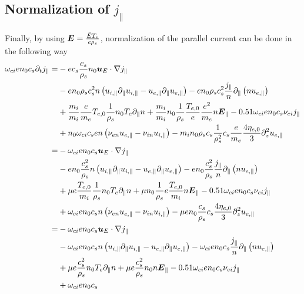 \subsection{Normalization of \texorpdfstring{$j_{\|}$}{the parallel current}}
%
Finally, by using $\boldsymbol{E}=\frac{\breve{E}T_e}{e\rho_s}$, normalization of the parallel current can be done in the following way
%
\begin{align*}
 \om_{ci}en_0c_s
 \partial_t j_\|
 =&
 - e c_s \frac{c_s}{\rho_s}n_0
    \ve{u}_E \cdot \nabla j_\|
    \\&
    - e n_0\rho_s c_s^2
    n \L( u_{i, \|}  \partial_\| u_{i,\|} - u_{e, \|} \partial_\| u_{e,\|} \R)
    - e n_0\rho_s c_s^2
    \frac{j_\|}{n}\partial_\|\L(n u_{e,\|} \R)
    \\&
    + \frac{m_i}{m_i} \frac{e}{m_e}T_{e,0}\frac{1}{\rho_s}n_0
    T_e\partial_\| n
    + \frac{m_i}{m_i}n_0 \frac{1}{\rho_s}\frac{T_{e,0}}{e}\frac{e^2}{m_e}
    n\ve{E}_\|
    - 0.51 \om_{ci}en_0c_s
    \nu_{ei} j_\|
    \\ &
    + n_0\om_{ci}c_s e
    n \L(\nu_{e n}u_{e,\|}-\nu_{i n}u_{i,\|} \R)
    - m_in_0\rho_s c_s\frac{1}{\rho_s^2}c_s
    \frac{e}{m_e} \frac{4\eta_{e,0}}{3} \partial_z^2 u_{e,\|}
 \\
 =&
 - \om_{ci}en_0c_s
 \ve{u}_E \cdot \nabla j_\|
    \\&
    - e n_0\frac{c_s^2}{\rho_s}
    n \L( u_{i, \|}  \partial_\| u_{i,\|} - u_{e, \|} \partial_\| u_{e,\|} \R)
    - e n_0\frac{c_s^2}{\rho_s}
    \frac{j_\|}{n}\partial_\|\L(n u_{e,\|} \R)
    \\&
    + \mu e \frac{T_{e,0}}{m_i}\frac{1}{\rho_s}n_0
    T_e\partial_\| n
    + \mu n_0 \frac{1}{\rho_s}e\frac{T_{e,0}}{m_i}
    n\ve{E}_\|
    - 0.51 \om_{ci}en_0c_s
    \nu_{ei} j_\|
    \\ &
    + \om_{ci}en_0c_s
    n \L(\nu_{e n}u_{e,\|}-\nu_{i n}u_{i,\|} \R)
    - \mu e n_0 \frac{c_s}{\rho_s}c_s
     \frac{4\eta_{e,0}}{3} \partial_z^2 u_{e,\|}
 \\
 =&
 - \om_{ci}en_0c_s
    \ve{u}_E \cdot \nabla j_\|
    \\&
    - \om_{ci}en_0c_s
    n \L( u_{i, \|}  \partial_\| u_{i,\|} - u_{e, \|} \partial_\| u_{e,\|} \R)
    - \om_{ci}en_0c_s
    \frac{j_\|}{n}\partial_\|\L(n u_{e,\|} \R)
    \\&
    + \mu e \frac{c_s^2}{\rho_s}n_0
    T_e\partial_\| n
    + \mu e \frac{c_s^2}{\rho_s}n_0
    n\ve{E}_\|
    - 0.51 \om_{ci}en_0c_s
    \nu_{ei} j_\|
    \\ &
    + \om_{ci}en_0c_s

\end{align*}
